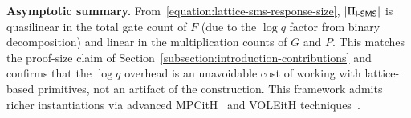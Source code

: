 \medskip
\noindent\textbf{Asymptotic summary.}
From~\eqref{equation:lattice-sms-response-size},
$|\Pi_{\mathsf{l}\textsf{-}\mathsf{SMS}}|$ is quasilinear in the total gate count of $F$
(due to the $\log q$ factor from binary decomposition)
and linear in the multiplication counts of $G$ and $P$.
This matches the proof-size claim of
Section~\ref{subsection:introduction-contributions}
and confirms that the $\log q$ overhead is an unavoidable cost
of working with lattice-based primitives, not an artifact of the construction.
This framework admits richer instantiations via advanced MPCitH~\cite{CCS:CDGORR17,CCS:KatKolWan18,PKC:BauNof20,CCS:DelOrsTan21,CRYPTO:FenJouRiv22,EC:CarCouJou23,EC:AGHHJY23,AC:AHJMRY23} and
VOLEitH techniques~\cite{CRYPTO:BBdSKORS23,PKC:CLYYYZ24,AC:OTX24,ACISP:Bui25}.